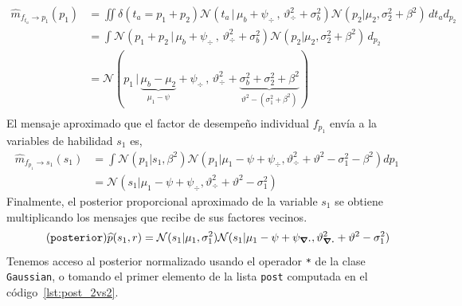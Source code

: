 \documentclass[a4paper,11pt]{book}
\newcommand{\N}{\mathcal{N}}
\theoremstyle{definition}
\begin{document}
%
\begin{equation}%
\begin{split}
\widehat{m}_{f_{t_a} \rightarrow p_1}(p_1) &= \iint \delta(t_a = p_1 + p_2) \N(t_a \, | \, \mu_b + \psi_{\div} \, , \, \vartheta_{\div}^2 + \sigma_b^2) \N(p_2 | \mu_2 , \sigma_2^2 + \beta^2)  \, d{t_a} d_{p_2} \\
& = \int \N(p_1 + p_2 \, | \, \mu_b + \psi_{\div} \, , \, \vartheta_{\div}^2 + \sigma_b^2) \N(p_2 | \mu_2 , \sigma_2^2+ \beta^2 )   \, d_{p_2} \\
& = \N( p_1 \,|\,  \underbrace{\mu_b - \mu_2}_{\mu_1-\psi} + \psi_{\div}  \,,\,\vartheta_{\div}^2 + \underbrace{\sigma_b^2 + \sigma_2^2 + \beta^2}_{\vartheta^2 - (\sigma_1^2 + \beta^2)})  \\
\end{split}
\end{equation}
%
El mensaje aproximado que el factor de desempeño individual $f_{p_1}$ envía a la variables de habilidad $s_1$ es,
%
\begin{equation}%
\begin{split}
\widehat{m}_{f_{p_1} \rightarrow s_1}(s_1) & = \int \N(p_1|s_1,\beta^2) \N(p_1| \mu_1 - \psi + \psi_{\div}, \vartheta_{\div}^2 + \vartheta^2 - \sigma_1^2 - \beta^2)dp_1 \\
& = \N(s_1| \mu_1 - \psi + \psi_{\div}, \vartheta_{\div}^2 + \vartheta^2 - \sigma_1^2)
\end{split}
\end{equation}
%
Finalmente, el posterior proporcional aproximado de la variable $s_1$ se obtiene multiplicando los mensajes que recibe de sus factores vecinos.
%
\begin{equation}\label{eq:^p_s} \tag{\texttt{posterior}}
 \widehat{p}(s_1, r) = \N(s_1|\mu_1, \sigma_1^2) \N(s_1| \mu_1 - \psi + \psi_{\div}, \vartheta_{\div}^2 + \vartheta^2 - \sigma_1^2)
\end{equation}
%
Tenemos acceso al posterior normalizado usando el operador \texttt{*} de la clase \texttt{Gaussian}, o tomando el primer elemento de la lista \texttt{post} computada en el c\'odigo~\ref{lst:post_2vs2}.
%
\end{document}
